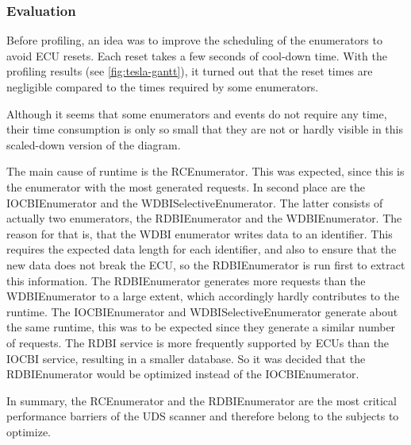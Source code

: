 \subsubsection{Evaluation}

Before profiling, an idea was to improve the scheduling of the enumerators to avoid ECU resets. Each reset takes a few seconds of cool-down time. With the profiling results (see \autoref{fig:tesla-gantt}), it turned out that the reset times are negligible compared to the times required by some enumerators.

Although it seems that some enumerators and events do not require any time, their time consumption is only so small that they are not or hardly visible in this scaled-down version of the diagram.

The main cause of runtime is the RCEnumerator. This was expected, since this is the enumerator with the most generated requests.
In second place are the IOCBIEnumerator and the WDBISelectiveEnumerator.
The latter consists of actually two enumerators, the RDBIEnumerator and the WDBIEnumerator. The reason for that is, that the WDBI enumerator writes data to an identifier. This requires the expected data length for each identifier, and also to ensure that the new data does not break the ECU, so the RDBIEnumerator is run first to extract this information.
The RDBIEnumerator generates more requests than the WDBIEnumerator to a large extent, which accordingly hardly contributes to the runtime.
The IOCBIEnumerator and WDBISelectiveEnumerator generate about the same runtime, this was to be expected since they generate a similar number of requests. The RDBI service is more frequently supported by ECUs than the IOCBI service, resulting in a smaller database. So it was decided that the RDBIEnumerator would be optimized instead of the IOCBIEnumerator.

In summary, the RCEnumerator and the RDBIEnumerator are the most critical performance barriers of the UDS scanner and therefore belong to the subjects to optimize.
